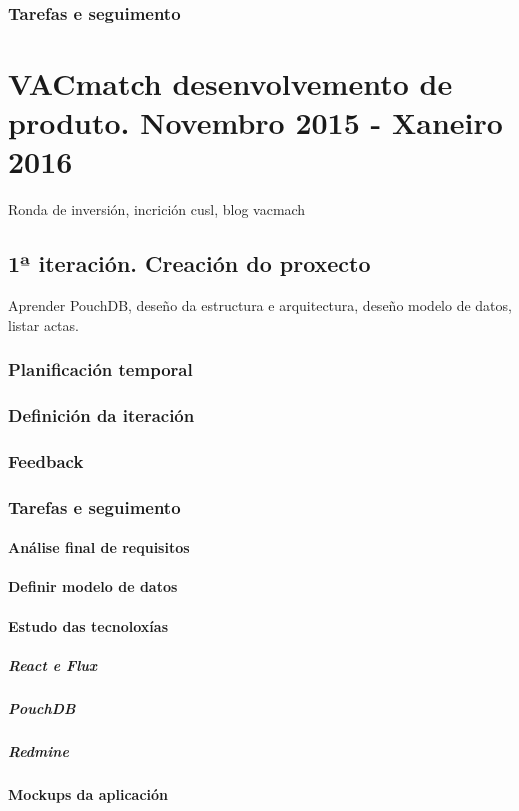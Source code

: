       \subsubsection{Tarefas e seguimento}


  \section{VACmatch desenvolvemento de produto. Novembro 2015 - Xaneiro 2016}
  Ronda de inversión, incrición cusl, blog vacmach

    \subsection{1ª iteración. Creación do proxecto}
    Aprender PouchDB, deseño da estructura e arquitectura, deseño modelo de datos, listar 
  actas.
      \subsubsection{Planificación temporal}
      \subsubsection{Definición da iteración}
      \subsubsection{Feedback}
      \subsubsection{Tarefas e seguimento}

        \paragraph{Análise final de requisitos}
        \paragraph{Definir modelo de datos}
        \paragraph{Estudo das tecnoloxías}
          \subparagraph{React e Flux}
          \subparagraph{PouchDB}
          \subparagraph{Redmine}
        \paragraph{Mockups da aplicación}
